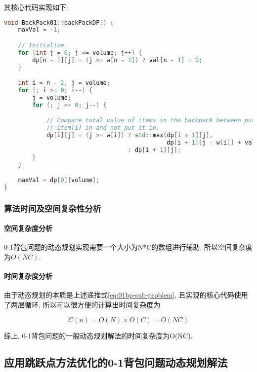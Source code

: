 其核心代码实现如下:

\begin{lstlisting}[language=c++]
void BackPack01::backPackDP() {
    maxVal = -1;

    // Initialize
    for (int j = 0; j <= volume; j++) {
        dp[n - 1][j] = (j >= w[n - 1]) ? val[n - 1] : 0;
    }

    int i = n - 2, j = volume;
    for (; i >= 0; i--) {
        j = volume;
        for (; j >= 0; j--) {

            // Compare total value of items in the backpack between put
            // item[i] in and not put it in.
            dp[i][j] = (j >= w[i]) ? std::max(dp[i + 1][j],
                                              dp[i + 1][j - w[i]] + val[i])
                                   : dp[i + 1][j];
        }
    }

    maxVal = dp[0][volume];
}
\end{lstlisting}

\subsubsection{算法时间及空间复杂性分析}
\paragraph{空间复杂度分析}
0-1背包问题的动态规划实现需要一个大小为N*C的数组进行辅助,
所以空间复杂度为$O(NC)$.

\paragraph{时间复杂度分析}
由于动态规划的本质是上述递推式\ref{eq:01bp-sub-problem},
且实现的核心代码使用了两层循环, 所以可以很方便的计算出时间复杂度为

\begin{equation}
	C(n) = O(N)\times O(C) = O(NC)
\end{equation}

综上, 0-1背包问题的一般动态规划解法的时间复杂度为O(NC).

\subsection{应用跳跃点方法优化的0-1背包问题动态规划解法}
